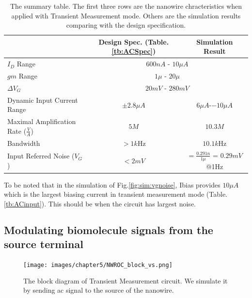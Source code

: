 {


\begin{table}[!htb]
    {\fontfamily{}\fontsize{10}{14}\selectfont
    \centering
    \begin{tabular}{l|c|c}
        & Design Spec. (Table.\ref{tb:ACSpec}) & Simulation Result \\
        \hline
        \hline
        $I_D$ Range & \multicolumn{2}{c}{$600n A$ - $10\mu A$}  \\
        \hline
        $gm$ Range & \multicolumn{2}{c}{$1\mu$ - $20\mu$}  \\
        \hline
        $\Delta V_G $ & \multicolumn{2}{c}{$20m V$ - $280m V$}  \\
        \hline
        Dynamic Input Current Range & $\pm 2.8\mu A$ & $6\mu A$-$-10\mu A$ \\
        \hline
        Maximal Amplification Rate ($\frac{V}{A}$)& $5M$ & $10.3M$\\
        \hline
        Bandwidth & $> 1k$Hz & $10.1k$Hz \\
        \hline
        Input Referred Noise ($V_G$) & $< 2m V$ & $ = \frac{0.291n}{1\mu}$ = $0.29m V$ @1Hz
    \end{tabular}
    \caption{The summary table. The first three rows are the nanowire chracteristics when applied with Transient Measurement mode.
    Others are the simulation results comparing with the design specification.}
    \label{tb:sim:vg}
    }
\end{table}

To be noted that in the simulation of Fig.\ref{fig:sim:vgnoise}, Ibias provides $10\mu A$ which is the largest biasing current in transient measurement mode (Table.\ref{tb:ACinput}).
This should be when the circuit has largest noise.

\subsection{Modulating biomolecule signals from the source terminal}
\begin{figure}[!htbp]
    \centering
        \texttt{[image: images/chapter5/NWROC\_block\_vs.png]}
    \caption{The block diagram of Transient Measurement circuit. We simulate it by sending ac signal to the source of the nanowire.}
    \label{fig:Nblockvs}
\end{figure}

}
